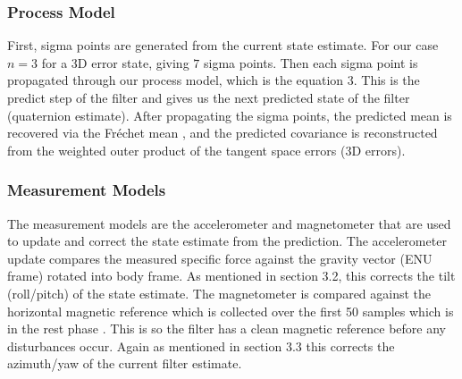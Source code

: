 \subsubsection{Process Model}
First, sigma points are generated from the current state estimate. For our case $n = 3$ for a 3D error state, giving $7$ sigma points. Then each sigma 
point is propagated through our process model, which is the equation 3. This is the predict step of the filter and gives us the next predicted state 
of the filter (quaternion estimate). After propagating the sigma points, the predicted mean is recovered via the Fréchet mean \cite{brossard_2020_a}, and the predicted
covariance is reconstructed from the weighted outer product of the tangent space errors (3D errors). 

\subsubsection{Measurement Models}
The measurement models are the accelerometer and magnetometer that are used to update and correct the state estimate from the prediction. The accelerometer update
compares the measured specific force against the gravity vector (ENU frame) rotated into body frame. As mentioned in section 3.2, this corrects the tilt (roll/pitch)
of the state estimate. The magnetometer is compared against the horizontal magnetic reference which is collected over the first 50 samples which is in the rest phase \cite{laidig_2021_broada}.
This is so the filter has a clean magnetic reference before any disturbances occur. Again as mentioned in section 3.3
this corrects the azimuth/yaw of the current filter estimate.


\newpage


